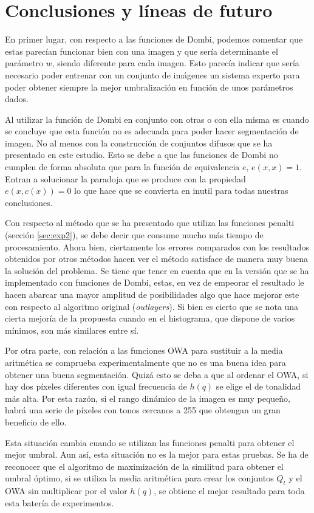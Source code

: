 \chapter{Conclusiones y líneas de futuro}\label{cap:conclusiones}

En primer lugar, con respecto a las funciones de Dombi, podemos comentar que estas parecían funcionar bien con una imagen y que sería determinante el parámetro $w$, siendo diferente para cada imagen. Esto parecía indicar que sería necesario poder entrenar con un conjunto de imágenes un sistema experto para poder obtener siempre la mejor umbralización en función de unos parámetros dados. 

Al utilizar la función de Dombi en conjunto con otras o con ella misma es cuando se concluye que esta función no es adecuada para poder hacer segmentación de imagen. No al menos con la construcción de conjuntos difusos que se ha presentado en este estudio. Esto se debe a que las funciones de Dombi no cumplen de forma absoluta que para la función de equivalencia $e$, $e(x,x)=1$. Entran a solucionar la paradoja que se produce con la propiedad $e(x,c(x))=0$ lo que hace que se convierta en inutil para todas nuestras conclusiones.

Con respecto al método que se ha presentado que utiliza las funciones penalti (sección \ref{sec:exp2}), se debe decir que consume mucho más tiempo de procesamiento. Ahora bien, ciertamente los errores comparados con los resultados obtenidos por otros métodos hacen ver el método satisface de manera muy buena la solución del problema. Se tiene que tener en cuenta que en la versión que se ha implementado con funciones de Dombi, estas, en vez de empeorar el resultado le hacen abarcar una mayor amplitud de posibilidades algo que hace mejorar este con respecto al algoritmo original ({\em outlayers}). Si bien es cierto que se nota una cierta mejoría de la propuesta cuando en el histograma, que dispone de varios mínimos, son más similares entre sí.

Por otra parte, con relación a las funciones OWA para sustituir a la media aritmética se comprueba experimentalmente que no es una buena idea para obtener una buena segmentación. Quizá esto se deba a que al ordenar el OWA, si hay dos píxeles diferentes con igual frecuencia de $h(q)$ se elige el de tonalidad más alta. Por esta razón, si el rango dinámico de la imagen es muy pequeño, habrá una serie de píxeles con tonos cercanos a 255 que obtengan un gran beneficio de ello. 

Esta situación cambia cuando se utilizan las funciones penalti para obtener el mejor umbral. Aun así, esta situación no es la mejor para estas pruebas. Se ha de reconocer que el algoritmo de maximización de la similitud para obtener el umbral óptimo, si se utiliza la media aritmética para crear los conjuntos $Q_t$ y el OWA sin multiplicar por el valor $h(q)$, se obtiene el mejor resultado para toda esta batería de experimentos. 


